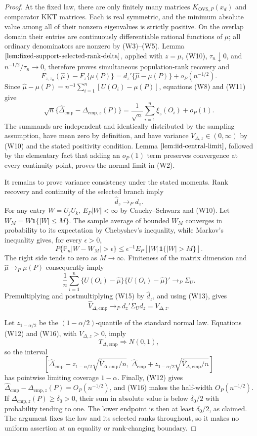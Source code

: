 \documentclass{article}
\begin{document}
\begin{proof}
At the fixed law, there are only finitely many matrices \(K_{\mathrm{OVS},P}(x_d)\) and comparator KKT matrices.  Each is real symmetric, and the minimum absolute value among all of their nonzero eigenvalues is strictly positive.  On the overlap domain their entries are continuously differentiable rational functions of \(\mu\); all ordinary denominators are nonzero by (W3)--(W5).  Lemma \(\ref{lem:fixed-support-selected-rank-delta}\), applied with \(z=\mu\), (W10), \(\tau_n\downarrow0\), and \(n^{-1/2}/\tau_n\to0\), therefore proves simultaneous population-rank recovery and
\[
 F_{z,\tau_n}(\widehat\mu)-F_z\{\mu(P)\}
 =d_z'\{\widehat\mu-\mu(P)\}+o_P(n^{-1/2}).
\tag{W11}
\]
Since \(\widehat\mu-\mu(P)=n^{-1}\sum_{i=1}^n[U(O_i)-\mu(P)]\), equations (W8) and (W11) give
\[
 \sqrt n\{\widehat\Delta_{\mathrm{cmp}}-\Delta_{\mathrm{cmp},z}(P)\}
 =\frac1{\sqrt n}\sum_{i=1}^n\xi_z(O_i)+o_P(1).
\tag{W12}
\]
The summands are independent and identically distributed by the sampling assumption, have mean zero by definition, and have variance \(V_{\Delta,z}\in(0,\infty)\) by (W10) and the stated positivity condition.  Lemma \(\ref{lem:iid-central-limit}\), followed by the elementary fact that adding an \(o_P(1)\) term preserves convergence at every continuity point, proves the normal limit in (W2).

It remains to prove variance consistency under the stated moments.  Rank recovery and continuity of the selected branch imply
\[
 \widehat d_z\longrightarrow_P d_z.
\tag{W13}
\]
For any entry \(W=U_jU_k\), \(E_P|W|<\infty\) by Cauchy--Schwarz and (W10).  Let \(W_M=W\mathbf 1\{|W|\le M\}\).  The sample average of bounded \(W_M\) converges in probability to its expectation by Chebyshev's inequality, while Markov's inequality gives, for every \(\epsilon>0\),
\[
 P\{\mathbb P_n|W-W_M|>\epsilon\}
 \le \epsilon^{-1}E_P[|W|\mathbf 1\{|W|>M\}].
\tag{W14}
\]
The right side tends to zero as \(M\to\infty\).  Finiteness of the matrix dimension and \(\widehat\mu\to_P\mu(P)\) consequently imply
\[
 \frac1n\sum_{i=1}^n
 \{U(O_i)-\widehat\mu\}\{U(O_i)-\widehat\mu\}'
 \longrightarrow_P\Sigma_U.
\tag{W15}
\]
Premultiplying and postmultiplying (W15) by \(\widehat d_z\), and using (W13), gives
\[
 \widehat V_{\Delta,\mathrm{cmp}}
 \longrightarrow_P d_z'\Sigma_Ud_z=V_{\Delta,z}.
\tag{W16}
\]

Let \(z_{1-\alpha/2}\) be the \((1-\alpha/2)\)-quantile of the standard normal law.  Equations (W12) and (W16), with \(V_{\Delta,z}>0\), imply
\[
 T_{\Delta,\mathrm{cmp}}\Rightarrow N(0,1),
\]
so the interval
\[
 \left[\widehat\Delta_{\mathrm{cmp}}
 -z_{1-\alpha/2}\sqrt{\widehat V_{\Delta,\mathrm{cmp}}/n},\ 
 \widehat\Delta_{\mathrm{cmp}}
 +z_{1-\alpha/2}\sqrt{\widehat V_{\Delta,\mathrm{cmp}}/n}\right]
\]
has pointwise limiting coverage \(1-\alpha\).  Finally, (W12) gives \(\widehat\Delta_{\mathrm{cmp}}-\Delta_{\mathrm{cmp},z}(P)=O_P(n^{-1/2})\), and (W16) makes the half-width \(O_P(n^{-1/2})\).  If \(\Delta_{\mathrm{cmp},z}(P)\ge\delta_0>0\), their sum in absolute value is below \(\delta_0/2\) with probability tending to one.  The lower endpoint is then at least \(\delta_0/2\), as claimed.  The argument fixes the law and its selected ranks throughout, so it makes no uniform assertion at an equality or rank-changing boundary.
\end{proof}
\end{document}

